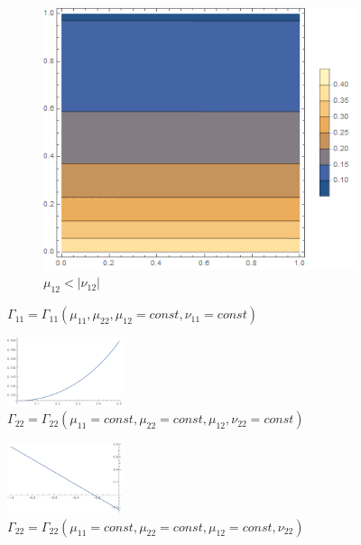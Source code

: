 \documentclass[12pt,a4]{article}
\begin{document}
\begin{figure}[!ht]
\begin{subfigure}[b]{0.3\textwidth}
	\end{subfigure}
	\hfill
	\begin{subfigure}[b]{0.3\textwidth}
		\centering
		\includegraphics[width=\textwidth]{Joonised/Gamma22Mu11Mu22III}
		\caption{$ \mu_{12} < | \nu_{12}| $}
	\end{subfigure}
	\caption{$ \Gamma_{11} = \Gamma_{11} (\mu_{11}, \mu_{22}, \mu_{12} = const, \nu_{11} = const) $}
\end{figure}
\begin{figure}[!ht]
	\centering
	\includegraphics[width=0.3\textwidth]{Joonised/Gamma22Mu12}
	\caption{$ \Gamma_{22} = \Gamma_{22} (\mu_{11} = const, \mu_{22} = const, \mu_{12}, \nu_{22} = const) $}
\end{figure}
\begin{figure}[!ht]
	\centering
	\includegraphics[width=0.3\textwidth]{Joonised/Gamma22Nu22I}
	\caption{$ \Gamma_{22} = \Gamma_{22} (\mu_{11} = const, \mu_{22} = const, \mu_{12} = const, \nu_{22}) $}
\end{figure}
\end{document}
